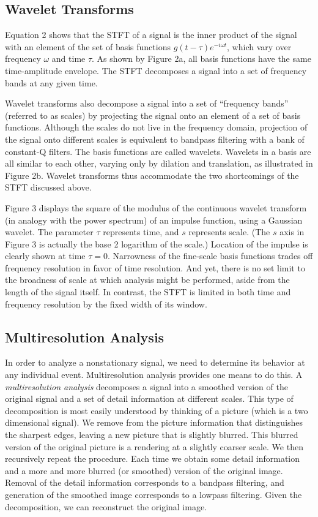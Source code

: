 \documentclass[a4paper,12pt]{article}
\begin{document}
\subsection{Wavelet Transforms}

Equation 2 shows that the STFT of a signal is the inner product of the signal with an element of the set of basis
functions \(g(t - \tau) e^{-i \omega t}\), which vary over frequency \(\omega\) and time \(\tau\). As shown by Figure 2a, all basis functions have the
same time-amplitude envelope. The STFT decomposes a signal into a set of frequency bands at any given time.

Wavelet transforms also decompose a signal into a set of ``frequency bands'' (referred to as scales) by projecting the
signal onto an element of a set of basis functions. Although the scales do not live in the frequency domain, projection
of the signal onto different scales is equivalent to bandpass filtering with a bank of constant-Q filters. The basis
functions are called wavelets. Wavelets in a basis are all similar to each other, varying only by dilation and
translation, as illustrated in Figure 2b. Wavelet transforms thus accommodate the two shortcomings of the STFT discussed
above.

Figure 3 displays the square of the modulus of the continuous wavelet transform (in analogy with the power spectrum) of an impulse function, using a Gaussian wavelet. The parameter \(\tau\) represents time, and \(s\) represents scale.
(The \(s\) axis in Figure 3 is actually the base 2 logarithm of the scale.) Location of the impulse is clearly shown at time \(\tau = 0\). Narrowness of the fine-scale basis functions trades off frequency resolution in favor of time resolution. And yet, there is no set limit to the broadness of scale at which analysis might be performed, aside from the length of the signal itself. In contrast, the STFT is limited in both time and frequency resolution by the fixed width of its window.

\subsection{Multiresolution Analysis}

In order to analyze a nonstationary signal, we need to determine its behavior at any individual event. Multiresolution analysis provides one means to do this. A \emph{multiresolution analysis} decomposes a signal into a smoothed version of the original signal and a set of detail information at different scales. This type of decomposition is most easily understood by thinking of a picture (which is a two dimensional signal). We remove from the picture information that distinguishes the sharpest edges, leaving a new picture that is slightly blurred. This blurred version of the original picture is a rendering at a slightly coarser scale. We then recursively repeat the procedure. Each time we obtain some detail information and a more and more blurred (or smoothed) version of the original image. Removal of the detail information corresponds to a bandpass filtering, and generation of the smoothed image corresponds to a lowpass filtering. Given the decomposition, we can reconstruct the original image.
\end{document}
